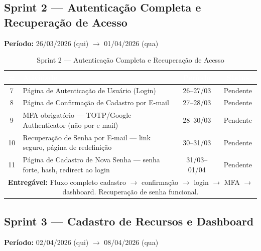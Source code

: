 \documentclass[12pt,a4paper]{article}
\begin{document}
\subsection{Sprint 2 — Autenticação Completa e Recuperação de Acesso}
\textbf{Período:} 26/03/2026 (qui) $\rightarrow$ 01/04/2026 (qua)

\begin{table}[H]
  \centering
  \caption{Sprint 2 — Autenticação Completa e Recuperação de Acesso}
  \label{tab:sprint2}
  \renewcommand{\arraystretch}{1.3}
  \small
  \begin{tabularx}{\textwidth}{|c|X|c|c|}
    \hline
    \rowcolor{cinzaHeader}
    \textcolor{white}{\textbf{\#}} &
    \textcolor{white}{\textbf{Atividade}} &
    \textcolor{white}{\textbf{Período}} &
    \textcolor{white}{\textbf{Status}} \\
    \hline
    \rowcolor{azulClaro}
    7  & Página de Autenticação de Usuário (Login) & 26--27/03 & Pendente \\
    \hline
    \rowcolor{azulClaro}
    8  & Página de Confirmação de Cadastro por E-mail & 27--28/03 & Pendente \\
    \hline
    \rowcolor{azulClaro}
    9  & MFA obrigatório — TOTP/Google Authenticator (não por e-mail) & 28--30/03 & Pendente \\
    \hline
    \rowcolor{azulClaro}
    10 & Recuperação de Senha por E-mail — link seguro, página de redefinição & 30--31/03 & Pendente \\
    \hline
    \rowcolor{azulClaro}
    11 & Página de Cadastro de Nova Senha — senha forte, hash, redirect ao login & 31/03--01/04 & Pendente \\
    \hline
    \multicolumn{4}{|p{\dimexpr\textwidth-2\tabcolsep-2\arrayrulewidth}|}{%
      \textbf{Entregável:} Fluxo completo cadastro $\rightarrow$ confirmação $\rightarrow$ login $\rightarrow$ MFA $\rightarrow$ dashboard. Recuperação de senha funcional.} \\
    \hline
  \end{tabularx}
\end{table}

\subsection{Sprint 3 — Cadastro de Recursos e Dashboard}
\textbf{Período:} 02/04/2026 (qui) $\rightarrow$ 08/04/2026 (qua)
\end{document}
